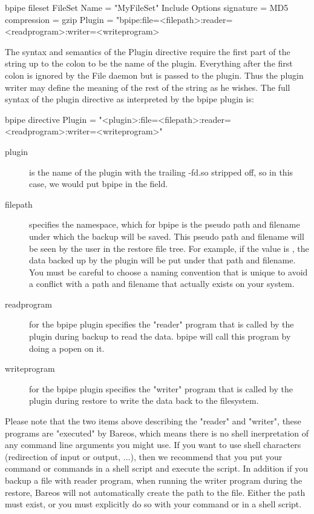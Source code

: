 \begin{bconfig}{bpipe fileset}
FileSet {
  Name = "MyFileSet"
  Include {
    Options {
      signature = MD5
      compression = gzip
    }
    Plugin = "bpipe:file=<filepath>:reader=<readprogram>:writer=<writeprogram>
  }
}
\end{bconfig}

The syntax and semantics of the Plugin directive require the first part of the string up to the colon to be the name of the plugin.
Everything after the first colon is ignored by the File daemon but is passed to the plugin. Thus the plugin writer may define the 
meaning of the rest of the string as he wishes. The full syntax of the plugin directive as interpreted by the bpipe plugin is:

\begin{bconfig}{bpipe directive}
Plugin = "<plugin>:file=<filepath>:reader=<readprogram>:writer=<writeprogram>"
\end{bconfig}

\begin{description}
\item[plugin] is the name of the plugin with the trailing -fd.so stripped off, so in this case, we would put bpipe in the field.

\item[filepath] specifies the namespace, which for bpipe is the pseudo path and filename under which the backup will be saved. This
pseudo path and filename will be seen by the user in the restore file tree. For example, if the value is ,
the data
backed up by the plugin will be put under that  path and filename.
You must be careful to choose a naming convention that is unique
to avoid a conflict with a path and filename that actually exists on your system.

\item[readprogram] for the bpipe plugin specifies the "reader" program that is called by the plugin during backup to read the data. bpipe
will call this program by doing a popen on it.

\item[writeprogram] for the bpipe plugin specifies the "writer" program that is called by the plugin during restore to write the data back 
to the filesystem.
\end{description}

Please note that the two items above describing the "reader" and "writer", these programs are "executed" by Bareos, which means 
there is no shell inerpretation of any command line arguments you might use. If you want to use shell characters (redirection of input 
or output, ...), then we recommend that you put your command or commands in a shell script and execute the script. In addition if you
backup a file with reader program, when running the writer program during the restore, Bareos will not automatically create the path
to the file. Either the path must exist, or you must explicitly do so with your command or in a shell script.

